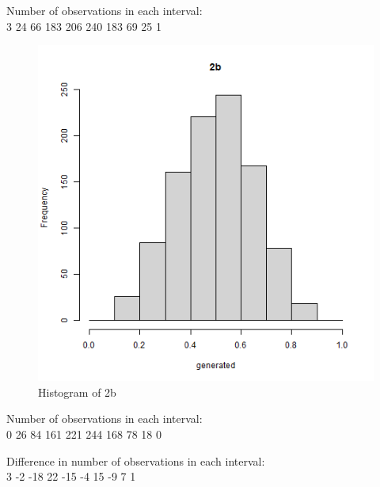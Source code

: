 \documentclass[12pt,letterpaper]{article}
\begin{document}
Number of observations in each interval:\\
3 24 66 183 206 240 183 69 25 1
\newpage
\begin{figure}[h]
  \centering
  \includegraphics[width=15cm]{Histogram_2.png}
  \caption{Histogram of 2b}
\end{figure}

Number of observations in each interval:\\
0 26 84 161 221 244 168 78 18 0
\newpage

Difference in number of observations in each interval:\\
3 -2 -18 22 -15 -4 15 -9 7 1\\
\vspace{4em}

\end{document}
